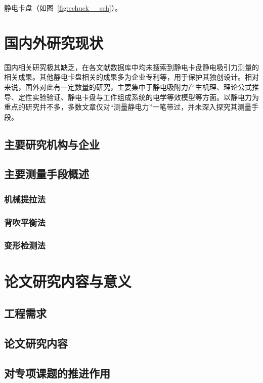 静电卡盘（如图~\ref{fig:echuck__sch}）。



\section{国内外研究现状}

国内相关研究极其缺乏，在各文献数据库中均未搜索到静电卡盘静电吸引力测量的相关成果。其他静电卡盘相关的成果多为企业专利等，用于保护其独创设计。相对来说，国外对此有一定数量的研究，主要集中于静电吸附力产生机理、理论公式推导、定性实验验证、静电卡盘与工件组成系统的电学等效模型等方面。以静电力为重点的研究并不多，多数文章仅对“测量静电力”一笔带过，并未深入探究其测量手段。


\subsection{主要研究机构与企业}


\subsection{主要测量手段概述}\label{sec:priorArt}

\subsubsection{机械提拉法}\label{sec:priorArt-pull}
\subsubsection{背吹平衡法}\label{sec:priorArt-backside}
\subsubsection{变形检测法}\label{sec:priorArt-warp}



\section{论文研究内容与意义}


\subsection{工程需求}


\subsection{论文研究内容}


\subsection{对专项课题的推进作用}